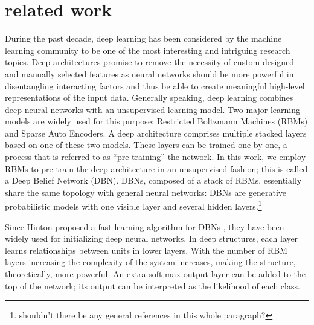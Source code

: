 \documentclass{article}
\begin{document}
\section{related work}
During the past decade, deep learning has been considered by the machine learning community to be one of the most interesting and intriguing research topics. Deep architectures promise to remove the necessity of custom-designed and manually selected features as neural networks should be more powerful in disentangling interacting factors and thus be able to create meaningful high-level representations of the input data. Generally speaking, deep learning combines deep neural networks with an unsupervised learning model. Two major learning models are widely used for this purpose: Restricted Boltzmann Machines (RBMs) and Sparse Auto Encoders. A deep architecture comprises multiple stacked layers based on one of these two models. These layers can be trained one by one, a process that is referred to as ``pre-training'' the network. In this work, we employ RBMs to pre-train the deep architecture in an unsupervised fashion; this is called a Deep Belief Network (DBN). DBNs, composed of a stack of RBMs, essentially share the same topology with general neural networks: DBNs are generative probabilistic models with one visible layer and several hidden layers.\footnote{shouldn't there be any general references in this whole paragraph?}
 
Since Hinton proposed a fast learning algorithm for DBNs \cite{hinton2006fast}, they have been widely used for initializing deep neural networks. In deep structures, each layer learns relationships between units in lower layers. With the number of RBM layers increasing the complexity of the system increases, making the structure, theoretically, more powerful. An extra soft max output layer can be added to the top of the network; its output can be interpreted as the likelihood of each class.
\end{document}
